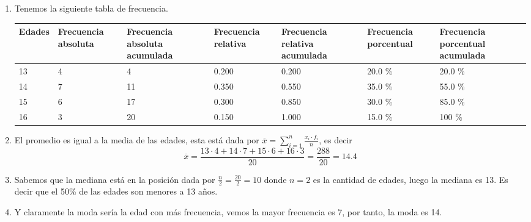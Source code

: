 \begin{solution}
    \begin{enumerate}
        \item Tenemos la siguiente tabla de frecuencia.
        \begin{table}[H]
            \centering
            \begin{tabular}{|p{1.7cm}|p{1.8cm}|p{2cm}|p{1.8cm}|p{2cm}|p{2cm}|p{2cm}|}
                \hline
                Edades & Frecuencia absoluta & Frecuencia absoluta acumulada & Frecuencia relativa & Frecuencia relativa acumulada & Frecuencia porcentual & Frecuencia porcentual acumulada\\
                \hline\hline
                13 & 4 &  4 & 0.200 & 0.200 & 20.0 \% & 20.0 \% \\\hline
                14 & 7 & 11 & 0.350 & 0.550 & 35.0 \% & 55.0 \% \\\hline
                15 & 6 & 17 & 0.300 & 0.850 & 30.0 \% & 85.0 \% \\\hline
                16 & 3 & 20 & 0.150 & 1.000 & 15.0 \% & 100 \% \\\hline
            \end{tabular}
        \end{table}
        \item El promedio es igual a la media de las edades, esta está dada por $\overline{x} = \sum_{i = 1}^{n} \frac{x_i \cdot f_i}{n}$, es decir
        \[
            \overline{x} = \frac{13\cdot 4 + 14\cdot 7 + 15\cdot 6 + 16\cdot3}{20} = \frac{288}{20} = 14.4
        \]
        \item Sabemos que la mediana está en la posición dada por $\frac{n}{2} = \frac{20}{2} = 10$ donde $n = 2$ es la cantidad de edades, luego la mediana es 13.
        Es decir que el 50\% de las edades son menores a 13 años.
        \item Y claramente la moda sería la edad con más frecuencia, vemos la mayor frecuencia es 7, por tanto, la moda es 14. \qedhere
    \end{enumerate}
\end{solution}

